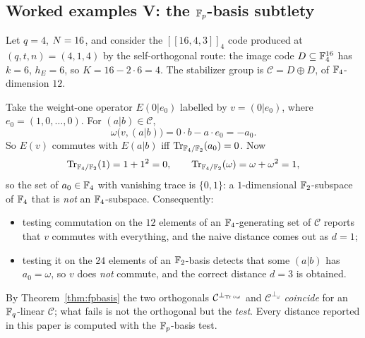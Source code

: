 \subsection{Worked examples V: the \texorpdfstring{$\mathbb F_p$}{F\_p}-basis subtlety}

\begin{example}\label{ex:fpbasis}
Let $q=4$, $N=16$, and consider the $[[16,4,3]]_4$ code produced at
$(q,t,n)=(4,1,4)$ by the self-orthogonal route: the image code
$D\subseteq\mathbb F_4^{16}$ has $k=6$, $h_E=6$, so $K=16-2\cdot6=4$. The stabilizer
group is $\mathcal C=D\oplus D$, of $\mathbb F_4$-dimension $12$.

Take the weight-one operator $E(0|e_0)$ labelled by $v=(0|e_0)$, where
$e_0=(1,0,\dots,0)$. For $(a|b)\in\mathcal C$,
\[
  \omega\bigl(v,(a|b)\bigr)=0\cdot b-a\cdot e_0=-a_0 .
\]
So $E(v)$ commutes with $E(a|b)$ iff $\operatorname{Tr}_{\mathbb F_4/\mathbb F_2}(a_0)=0$. Now
\[
  \operatorname{Tr}_{\mathbb F_4/\mathbb F_2}(1)=1+1^2=0,\qquad \operatorname{Tr}_{\mathbb F_4/\mathbb F_2}(\omega)=\omega+\omega^2=1,
\]
so the set of $a_0\in\mathbb F_4$ with vanishing trace is $\{0,1\}$: a
$1$-dimensional $\mathbb F_2$-subspace of $\mathbb F_4$ that is \emph{not} an
$\mathbb F_4$-subspace. Consequently:
\begin{itemize}[leftmargin=*]
\item testing commutation on the $12$ elements of an $\mathbb F_4$-generating set of
  $\mathcal C$ reports that $v$ commutes with everything, and the naive
  distance comes out as $d=1$;
\item testing it on the $24$ elements of an $\mathbb F_2$-basis detects that some
  $(a|b)$ has $a_0=\omega$, so $v$ does \emph{not} commute, and the correct
  distance $d=3$ is obtained.
\end{itemize}
By Theorem~\ref{thm:fpbasis} the two orthogonals
$\mathcal C^{\perp_{\operatorname{Tr}\circ\omega}}$ and $\mathcal C^{\perp_\omega}$
\emph{coincide} for an $\mathbb F_q$-linear $\mathcal C$; what fails is not the
orthogonal but the \emph{test}. Every distance reported in this paper is
computed with the $\mathbb F_p$-basis test.
\end{example}

